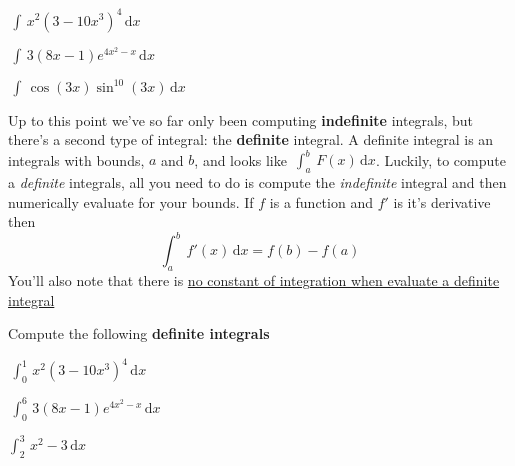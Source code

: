 \documentclass[addpoints]{exam}
\theoremstyle{definition}
\theoremstyle{plain}
\begin{document}
\begin{questions}
    \begin{minipage}{0.45\linewidth}
        \question $\displaystyle\,\int\,x^2\left(3-10x^3\right)^{4}\,\mathrm{d}x$ 
    \end{minipage}
    \hfill
    \begin{minipage}{0.45\linewidth}
        \question $\displaystyle\,\int\,3\left(8x-1\right)e^{4x^2-x}\,\mathrm{d}x$
    \end{minipage}
    \question $\displaystyle\,\int\,\cos\left(3x\right)\sin^{10}\left(3x\right)\,\mathrm{d}x$
\end{questions}

\newpage 

\begin{tcolorbox}[breakable, title=\subsection{DEFINITE INTEGRALS}, colframe=black, sharp corners, colback=Azure4!30, colbacktitle=DarkOrchid2!60, coltitle=black]
    Up to this point we've so far only been computing \textbf{indefinite} integrals, but there's a second type of integral: the \textbf{definite} integral. A definite integral is an integrals with bounds, $a$ and $b$, and looks like $\displaystyle\,\int_{a}^{b}\,F(x)\,\mathrm{d}x$. Luckily, to compute a \emph{definite} integrals, all you need to do is compute the \emph{indefinite} integral and then numerically evaluate for your bounds. If $f$ is a function and $f'$ is it's derivative then
    \[
        \int_{a}^{b}\,f'(x)\,\mathrm{d}x = f(b) - f(a)
    \]
    You'll also note that there is \underline{no constant of integration when evaluate a definite integral}
\end{tcolorbox}
Compute the following \textbf{definite integrals}
\begin{questions}
    \begin{minipage}{0.45\linewidth}
        \question $\displaystyle\,\int_{0}^{1}\,x^2\left(3-10x^3\right)^{4}\,\mathrm{d}x$ 
    \end{minipage}
    \hfill
    \begin{minipage}{0.45\linewidth}
        \question $\displaystyle\,\int_{0}^{6}\,3\left(8x-1\right)e^{4x^2-x}\,\mathrm{d}x$
    \end{minipage}
    \question $\displaystyle\int_{2}^{3}\,x^2-3\,\mathrm{d}x$
\end{questions}
\end{document}
